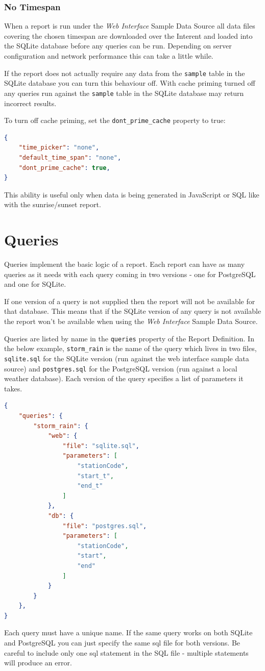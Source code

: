 \documentclass[a4paper,10pt]{book}
\begin{document}
\subsection{No Timespan}
\label{sec_no_timespan}
When a report is run under the \emph{Web Interface} Sample Data Source all data files covering the chosen timespan are downloaded over the Interent and loaded into the SQLite database before any queries can be run. Depending on server configuration and network performance this can take a little while.

If the report does not actually require any data from the \verb|sample| table in the SQLite database you can turn this behaviour off. With cache priming turned off any queries run against the \verb|sample| table in the SQLite database may return incorrect results.

To turn off cache priming, set the \verb|dont_prime_cache| property to true:
\begin{lstlisting}[language=json]
{
	"time_picker": "none",
	"default_time_span": "none",
	"dont_prime_cache": true,
}
\end{lstlisting}

This ability is useful only when data is being generated in JavaScript or SQL like with the sunrise/sunset report.

\chapter{Queries}
Queries implement the basic logic of a report. Each report can have as many queries as it needs with each query coming in two versions - one for PostgreSQL and one for SQLite. 

If one version of a query is not supplied then the report will not be available for that database. This means that if the SQLite version of any query is not available the report won't be available when using the \emph{Web Interface} Sample Data Source.

Queries are listed by name in the \verb|queries| property of the Report Definition. In the below example, \verb|storm_rain| is the name of the query which lives in two files, \verb|sqlite.sql| for the SQLite version (run against the web interface sample data source) and \verb|postgres.sql| for the PostgreSQL version (run against a local weather database). Each version of the query specifies a list of parameters it takes.
\begin{lstlisting}[language=json]
{
	"queries": {
		"storm_rain": {
			"web": {
				"file": "sqlite.sql",
				"parameters": [
					"stationCode",
					"start_t",
					"end_t"
				]
			},
			"db": {
				"file": "postgres.sql",
				"parameters": [
					"stationCode",
					"start",
					"end"
				]
			}
		}
	},
}
\end{lstlisting}
Each query must have a unique name. If the same query works on both SQLite and PostgreSQL you can just specify the same sql file for both versions. Be careful to include only one sql statement in the SQL file - multiple statements will produce an error.
\end{document}
